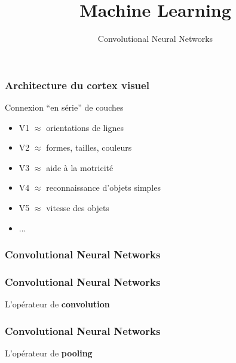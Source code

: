 \documentclass{formation}
\title{Machine Learning}
\subtitle{Convolutional Neural Networks}
\begin{document}
\maketitle

\begin{frame}
  \frametitle{Architecture du cortex visuel}
  \begin{minipage}[l]{0.55\linewidth}
  \end{minipage}\hfill
  \begin{minipage}[l]{0.44\linewidth}
    Connexion ``en série'' de couches
    \begin{itemize}
    \item V1 $\approx$ orientations de lignes
    \item V2 $\approx$ formes, tailles, couleurs
    \item V3 $\approx$ aide à la motricité
    \item V4 $\approx$ reconnaissance d'objets simples
    \item V5 $\approx$ vitesse des objets
    \item ...
    \end{itemize}
  \end{minipage}\hfill
\end{frame}

\begin{frame}
  \frametitle{Convolutional Neural Networks}
\end{frame}

\begin{frame}
  \frametitle{Convolutional Neural Networks}
  L'opérateur de \textbf{convolution}
\end{frame}

\begin{frame}
  \frametitle{Convolutional Neural Networks}
  L'opérateur de \textbf{pooling}
\end{frame}
\end{document}

